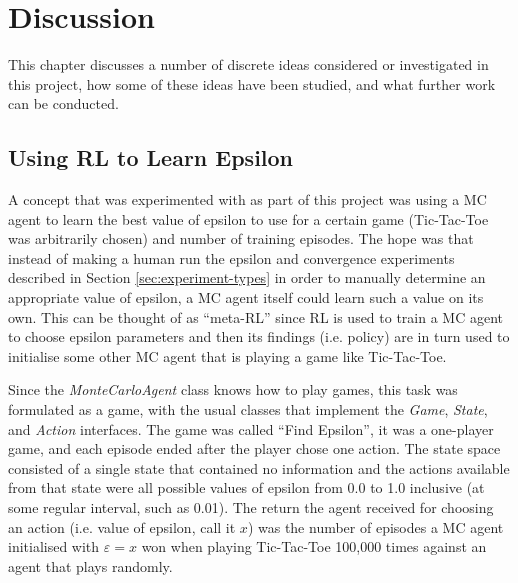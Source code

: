 \documentclass[11pt,a4paper]{report}
\begin{document}
\chapter{Discussion}

This chapter discusses a number of discrete ideas considered or investigated in this project, how some of these ideas have been studied, and what further work can be conducted.


\section{Using RL to Learn Epsilon}

A concept that was experimented with as part of this project was using a MC agent to learn the best value of epsilon to use for a certain game (Tic-Tac-Toe was arbitrarily chosen) and number of training episodes. The hope was that instead of making a human run the epsilon and convergence experiments described in Section \ref{sec:experiment-types} in order to manually determine an appropriate value of epsilon, a MC agent itself could learn such a value on its own. This can be thought of as ``meta-RL'' since RL is used to train a MC agent to choose epsilon parameters and then its findings (i.e. policy) are in turn used to initialise some other MC agent that is playing a game like Tic-Tac-Toe.

Since the \emph{MonteCarloAgent} class knows how to play games, this task was formulated as a game, with the usual classes that implement the \emph{Game}, \emph{State}, and \emph{Action} interfaces. The game was called ``Find Epsilon'', it was a one-player game, and each episode ended after the player chose one action. The state space consisted of a single state that contained no information and the actions available from that state were all possible values of epsilon from 0.0 to 1.0 inclusive (at some regular interval, such as 0.01). The return the agent received for choosing an action (i.e. value of epsilon, call it $x$) was the number of episodes a MC agent initialised with $\varepsilon = x$ won when playing Tic-Tac-Toe 100,000 times against an agent that plays randomly.
\end{document}
